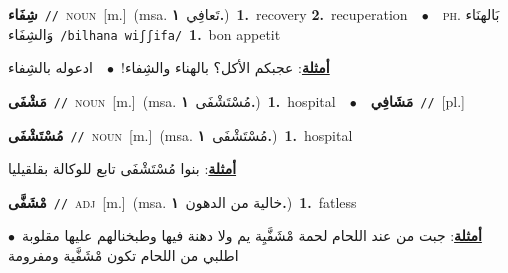 \documentclass[10pt,a4paper,twoside]{article} %
\begin{document}
\begin{multicols}{2}
{\setlength\topsep{0pt}\textbf{\foreignlanguage{arabic}{شِفَاء}}\ {\color{gray}\texttt{//}\color{black}}\ \textsc{noun}\ [m.]\ \color{gray}(msa. \foreignlanguage{arabic}{تَعافِي}~\foreignlanguage{arabic}{\textbf{١.}})\color{black}\ \textbf{1.}~recovery  \textbf{2.}~recuperation\ \ $\bullet$\ \ \textsc{ph.} \color{gray} \foreignlanguage{arabic}{بَالهنَاء وَالشِفَاء}\color{black}\ {\color{gray}\texttt{/{\sffamily bilhana wiʃʃifa}/}\color{black}}\ \textbf{1.}~bon appetit\  \begin{flushright}\color{gray}\foreignlanguage{arabic}{\textbf{\underline{\foreignlanguage{arabic}{أمثلة}}}: عجبكم الأكل؟ بالهناء والشِفاء!\ $\bullet$\ \  ادعوله بالشِفاء}\end{flushright}\color{black}} \vspace{2mm}

{\setlength\topsep{0pt}\textbf{\foreignlanguage{arabic}{مَشْفَى}}\ {\color{gray}\texttt{//}\color{black}}\ \textsc{noun}\ [m.]\ \color{gray}(msa. \foreignlanguage{arabic}{مُسْتَشْفَى}~\foreignlanguage{arabic}{\textbf{١.}})\color{black}\ \textbf{1.}~hospital\ \ $\bullet$\ \ \setlength\topsep{0pt}\textbf{\foreignlanguage{arabic}{مَشَافِي}}\ {\color{gray}\texttt{//}\color{black}}\ [pl.]\ } \vspace{2mm}

{\setlength\topsep{0pt}\textbf{\foreignlanguage{arabic}{مُسْتَشْفَى}}\ {\color{gray}\texttt{//}\color{black}}\ \textsc{noun}\ [m.]\ \color{gray}(msa. \foreignlanguage{arabic}{مُسْتَشْفَى}~\foreignlanguage{arabic}{\textbf{١.}})\color{black}\ \textbf{1.}~hospital\  \begin{flushright}\color{gray}\foreignlanguage{arabic}{\textbf{\underline{\foreignlanguage{arabic}{أمثلة}}}: بنوا مُسْتَشْفَى تابع للوكالة بقلقيليا}\end{flushright}\color{black}} \vspace{2mm}

{\setlength\topsep{0pt}\textbf{\foreignlanguage{arabic}{مْشَفَّى}}\ {\color{gray}\texttt{//}\color{black}}\ \textsc{adj}\ [m.]\ \color{gray}(msa. \foreignlanguage{arabic}{خالية من الدهون}~\foreignlanguage{arabic}{\textbf{١.}})\color{black}\ \textbf{1.}~fatless\  \begin{flushright}\color{gray}\foreignlanguage{arabic}{\textbf{\underline{\foreignlanguage{arabic}{أمثلة}}}: جبت من عند اللحام لحمة مْشَفَّيِة يم ولا دهنة فيها وطبخنالهم عليها مقلوبة\ $\bullet$\ \  اطلبي من اللحام تكون مْشَفَّية ومفرومة}\end{flushright}\color{black}} \vspace{2mm}


\end{multicols}
\end{document}

